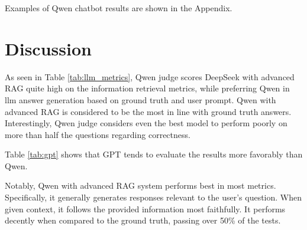 \documentclass[fleqn,moreauthors,10pt]{ds_report}
\begin{document}
Examples of Qwen chatbot results are shown in the Appendix.


\section*{Discussion}









As seen in Table \ref{tab:llm_metrics}, Qwen judge scores DeepSeek with advanced RAG quite high on the information retrieval metrics, while preferring Qwen in \ac{llm} answer generation based on ground truth and user prompt. Qwen with advanced RAG is considered to be the most in line with ground truth answers. Interestingly, Qwen judge considers even the best model to perform poorly on more than half the questions regarding correctness.

Table \ref{tab:gpt} shows that GPT tends to evaluate the results more favorably than Qwen.

Notably, Qwen with advanced RAG system performs best in most metrics. Specifically, it generally generates responses relevant to the user's question. When given context, it follows the provided information most faithfully. It performs decently when compared to the ground truth, passing over 50\% of the tests.
\end{document}
